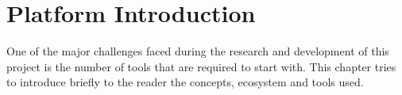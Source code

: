 \chapter{Platform Introduction}

One of the major challenges faced during the research and development of this
project is the number of tools that are required to start with. This chapter
tries to introduce briefly to the reader the concepts, ecosystem and tools used.






